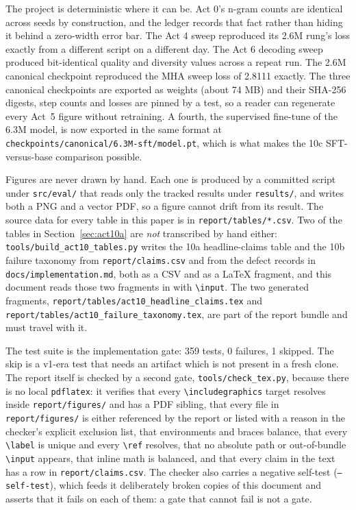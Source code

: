 \documentclass[11pt,a4paper]{article}
\begin{document}
The project is deterministic where it can be. Act 0's n-gram counts are
identical across seeds by construction, and the ledger records that fact rather
than hiding it behind a zero-width error bar. The Act 4 sweep reproduced its
2.6M rung's loss exactly from a different script on a different day. The Act 6
decoding sweep produced bit-identical quality and diversity values across a
repeat run. The 2.6M canonical checkpoint reproduced the MHA sweep loss of
2.8111 exactly. The three canonical checkpoints are exported as weights
(about 74 MB) and their SHA-256 digests, step counts and losses are pinned by
a test, so a reader can regenerate every Act~5 figure without retraining. A
fourth, the supervised fine-tune of the 6.3M model, is now exported in the
same format at
\texttt{checkpoints/canonical/6.3M-sft/model.pt}, which is what makes the
10c SFT-versus-base comparison possible.

Figures are never drawn by hand. Each one is produced by a committed script
under \texttt{src/eval/} that reads only the tracked results under
\texttt{results/}, and writes both a PNG and a vector PDF, so a figure cannot
drift from its result. The source data for every table in this paper is in
\texttt{report/tables/*.csv}. Two of the tables in Section~\ref{sec:act10a}
are \emph{not} transcribed by hand either: \texttt{tools/build\_act10\_tables.py}
writes the 10a headline-claims table and the 10b failure taxonomy from
\texttt{report/claims.csv} and from the defect records in
\texttt{docs/implementation.md}, both as a CSV and as a LaTeX fragment, and
this document reads those two fragments in with
\texttt{\textbackslash input}. The two generated fragments,
\texttt{report/tables/\allowbreak act10\_headline\_claims.tex} and
\texttt{report/tables/act10\_failure\_taxonomy.tex}, are part of the report
bundle and must travel with it.

The test suite is the implementation gate: 359 tests, 0 failures, 1 skipped.
The skip is a v1-era test that needs an artifact which is not present in a
fresh clone. The report itself is checked by a second gate, \texttt{tools/check\_tex.py},
because there is no local \texttt{pdflatex}: it verifies that every
\texttt{\textbackslash includegraphics} target resolves inside
\texttt{report/figures/} and has a PDF sibling, that every file in
\texttt{report/figures/} is either referenced by the report or listed with a
reason in the checker's explicit exclusion list, that environments and braces
balance, that every \texttt{\textbackslash label} is unique and every
\texttt{\textbackslash ref} resolves, that no absolute path or out-of-bundle
\texttt{\textbackslash input} appears, that inline math is balanced, and that
every claim in the text has a row in \texttt{report/claims.csv}. The checker
also carries a negative self-test (\texttt{--self-test}), which feeds it
deliberately broken copies of this document and asserts that it fails on each
of them: a gate that cannot fail is not a gate.
\end{document}
